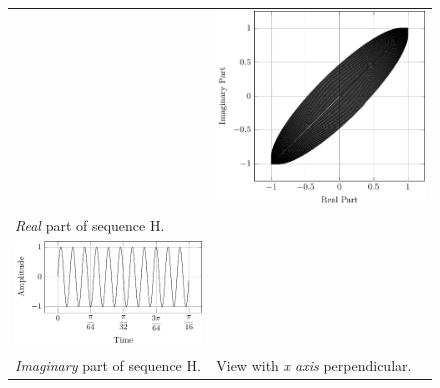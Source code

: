 \documentclass[../../course]{subfiles}
\begin{document}
\begin{figure} [H]
\begin{NiceTabularX} {\textwidth} {
            *{2}{>{\centering\arraybackslash}X}
        }
        &

         {
             {
                \includegraphics[height = \textheight] {tikzpics/plotFrontViewComplexH.pdf}
            }
        }

        \\

         {\emph{Real} part of sequence H.}
        \label{plt:realCmplxH}

        &
        \\

         {
             {
                \includegraphics[height = \textheight] {tikzpics/plotShortX2.pdf}
            }
        }

        &
        \\

         {\emph{Imaginary} part of sequence H.}
        \label{plt:imagCmplxH}

        &

         {View with \emph{x axis} perpendicular.}
        \label{plt:frontViewCmplxH}

        \\

    \end{NiceTabularX}

\end{figure}
\end{document}
